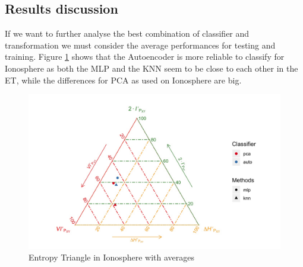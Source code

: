 \subsection{Results discussion}

If we want to further analyse the best combination of classifier and  transformation we must consider the average performances for testing and training. 
Figure \ref{fig:figure_Total_Ionosphere_ET} shows that the Autoencoder is more reliable to classify for Ionosphere as both the MLP and the KNN seem to be close to each other in the ET, while the differences for PCA as used on Ionosphere are big. 
%
\begin{figure}[H]
	\centering
	\includegraphics[width=1\linewidth]{Figuras_tfg/ET_Iono_Total_Results}
	\caption{Entropy Triangle in Ionosphere with averages}
	\label{fig:figure_Total_Ionosphere_ET}
\end{figure}

